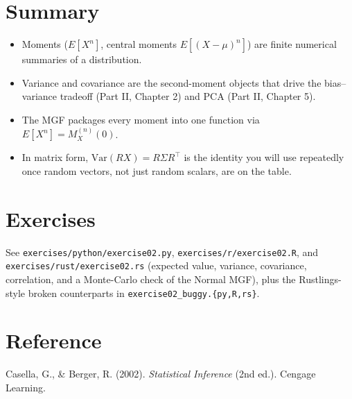 \documentclass[11pt]{article}
\begin{document}
\section{Summary}
\begin{summarybox}
\begin{itemize}[nosep]
  \item Moments ($E[X^n]$, central moments $E[(X-\mu)^n]$) are finite
        numerical summaries of a distribution.
  \item Variance and covariance are the second-moment objects that drive
        the bias--variance tradeoff (Part II, Chapter 2) and PCA (Part II,
        Chapter 5).
  \item The MGF packages every moment into one function via
        $E[X^n] = M_X^{(n)}(0)$.
  \item In matrix form, $\mathrm{Var}(RX) = R\Sigma R^\top$ is the identity
        you will use repeatedly once random vectors, not just random
        scalars, are on the table.
\end{itemize}
\end{summarybox}

\section{Exercises}
See \texttt{exercises/python/exercise02.py}, \texttt{exercises/r/exercise02.R},
and \texttt{exercises/rust/exercise02.rs} (expected value, variance,
covariance, correlation, and a Monte-Carlo check of the Normal MGF), plus the
Rustlings-style broken counterparts in \texttt{exercise02\_buggy.\{py,R,rs\}}.

\section*{Reference}
Casella, G., \& Berger, R. (2002). \emph{Statistical Inference} (2nd ed.).
Cengage Learning.
\end{document}

